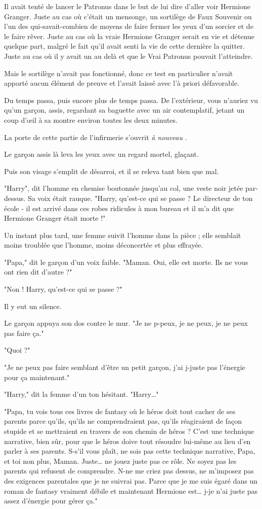 Il avait tenté de lancer le Patronus dans le but de lui dire d'aller voir Hermione Granger. Juste au cas où c'était un mensonge, un sortilège de Faux Souvenir ou l'un des qui-savait-combien de moyens de faire fermer les yeux d'un sorcier et de le faire rêver. Juste au cas où la vraie Hermione Granger serait en vie et détenue quelque part, malgré le fait qu'il avait senti la vie de cette dernière la quitter. Juste au cas où il y avait un au delà et que le Vrai Patronus pouvait l'atteindre.

Mais le sortilège n'avait pas fonctionné, donc ce test en particulier n'avait apporté aucun élément de preuve et l'avait laissé avec l'à priori défavorable.

Du temps passa, puis encore plus de temps passa. De l'extérieur, vous n'auriez vu qu'un garçon, assis, regardant sa baguette avec un air contemplatif, jetant un coup d'œil à sa montre environ toutes les deux minutes.

La porte de cette partie de l'infirmerie s'ouvrit \emph{à nouveau} .

Le garçon assis là leva les yeux avec un regard mortel, glaçant.

Puis son visage s'emplit de désarroi, et il se releva tant bien que mal.

"Harry", dit l'homme en chemise boutonnée jusqu'au col, une veste noir jetée par-dessus. Sa voix était rauque. "Harry, qu'est-ce qui se passe ? Le directeur de ton école - il est arrivé dans ces robes ridicules à mon bureau et il m'a dit que Hermione Granger était morte !"

Un instant plus tard, une femme suivit l'homme dans la pièce ; elle semblait moins troublée que l'homme, moins déconcertée et plus effrayée.

"Papa," dit le garçon d'un voix faible. "Maman. Oui, elle est morte. Ils ne vous ont rien dit d'autre ?"

"Non ! Harry, qu'est-ce qui se passe ?"

Il y eut un silence.

Le garçon appuya son dos contre le mur. "Je ne p-peux, je ne peux, je ne peux pas faire ça."

"Quoi ?"

"Je ne peux pas faire semblant d'être un petit garçon, j'ai j-juste pas l'énergie pour ça maintenant."

"Harry," dit la femme d'un ton hésitant. "Harry…"

"Papa, tu vois tous ces livres de fantasy où le héros doit tout cacher de ses parents parce qu'ils, qu'ils ne comprendraient pas, qu'ils réagiraient de façon stupide et se mettraient en travers de son chemin de héros ? C'est une technique narrative, bien sûr, pour que le héros doive tout résoudre lui-même au lieu d'en parler à ses parents. S-s'il vous plaît, ne sois pas cette technique narrative, Papa, et toi non plus, Maman. Juste… ne jouez juste pas ce rôle. Ne soyez pas les parents qui refusent de comprendre. N-ne me criez pas dessus, ne m'imposez pas des exigences parentales que je ne suivrai pas. Parce que je me suis égaré dans un roman de fantasy vraiment débile et maintenant Hermione est… j-je n'ai juste pas assez d'énergie pour gérer ça."


